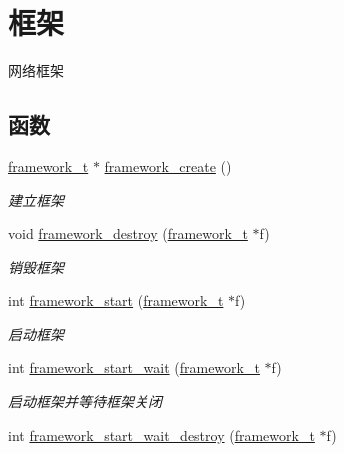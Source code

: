 \hypertarget{a00102}{}\section{框架}
\label{a00102}


网络框架  


\subsection*{函数}
\begin{DoxyCompactItemize}
\item 
\hyperlink{a00050_a6149d769f6f07ed14a40a271c95d8463_a6149d769f6f07ed14a40a271c95d8463}{framework\+\_\+t} $\ast$ \hyperlink{a00102_ga90b29a0c500209cb9b37437a32188a40_ga90b29a0c500209cb9b37437a32188a40}{framework\+\_\+create} ()
\begin{DoxyCompactList}\small\item\em 建立框架 \end{DoxyCompactList}\item 
void \hyperlink{a00102_gad1b6cb17014bfc515f8861bad3198e22_gad1b6cb17014bfc515f8861bad3198e22}{framework\+\_\+destroy} (\hyperlink{a00050_a6149d769f6f07ed14a40a271c95d8463_a6149d769f6f07ed14a40a271c95d8463}{framework\+\_\+t} $\ast$f)
\begin{DoxyCompactList}\small\item\em 销毁框架 \end{DoxyCompactList}\item 
int \hyperlink{a00102_ga23293faa7cc7d9f88ec73d4430a2355e_ga23293faa7cc7d9f88ec73d4430a2355e}{framework\+\_\+start} (\hyperlink{a00050_a6149d769f6f07ed14a40a271c95d8463_a6149d769f6f07ed14a40a271c95d8463}{framework\+\_\+t} $\ast$f)
\begin{DoxyCompactList}\small\item\em 启动框架 \end{DoxyCompactList}\item 
int \hyperlink{a00102_ga5fb7151fc13ce397884a7673b4fd319b_ga5fb7151fc13ce397884a7673b4fd319b}{framework\+\_\+start\+\_\+wait} (\hyperlink{a00050_a6149d769f6f07ed14a40a271c95d8463_a6149d769f6f07ed14a40a271c95d8463}{framework\+\_\+t} $\ast$f)
\begin{DoxyCompactList}\small\item\em 启动框架并等待框架关闭 \end{DoxyCompactList}\item 
int \hyperlink{a00102_ga4af709f98e2bd206da043cc29f915c99_ga4af709f98e2bd206da043cc29f915c99}{framework\+\_\+start\+\_\+wait\+\_\+destroy} (\hyperlink{a00050_a6149d769f6f07ed14a40a271c95d8463_a6149d769f6f07ed14a40a271c95d8463}{framework\+\_\+t} $\ast$f)

\end{DoxyCompactItemize}
